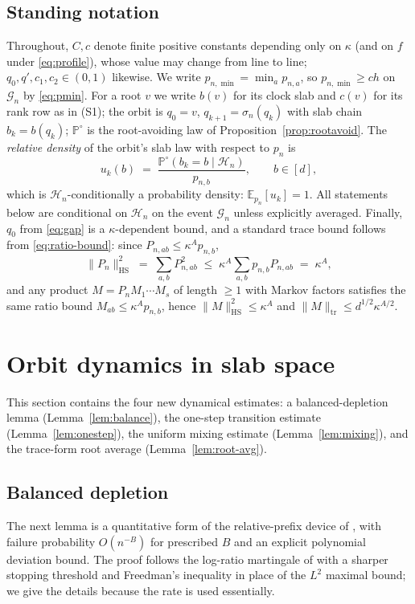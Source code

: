 \documentclass[11pt]{article}
\newcommand{\E}{\mathbb{E}}
\newcommand{\Prob}{\mathbb{P}}
\newcommand{\1}{\mathbf{1}}
\newcommand{\cG}{\mathcal{G}}
\newcommand{\cH}{\mathcal{H}}
\theoremstyle{remark}
\begin{document}
\subsection{Standing notation}
Throughout, $C,c$ denote finite positive constants depending only on $\kappa$
(and on $f$ under \eqref{eq:profile}), whose value may change from line to
line; $q_0,q',c_1,c_2\in(0,1)$ likewise. We write
$p_{n,\min}=\min_a p_{n,a}$, so $p_{n,\min}\ge ch$ on $\cG_n$ by
\eqref{eq:pmin}. For a root $v$ we write $b(v)$ for its clock slab and $c(v)$
for its rank row as in (S1); the orbit is $q_0=v$, $q_{k+1}=\sigma_n(q_k)$
with slab chain $b_k=b(q_k)$; $\Prob^\circ$ is the root-avoiding law of
Proposition~\ref{prop:rootavoid}. The \emph{relative density} of the orbit's
slab law with respect to $p_n$ is
\[
u_k(b)\;=\;\frac{\Prob^\circ(b_k=b\mid\cH_n)}{p_{n,b}},\qquad b\in[d],
\]
which is $\cH_n$-conditionally a probability density: $\E_{p_n}[u_k]=1$.
All statements below are conditional on $\cH_n$ on the event $\cG_n$ unless
explicitly averaged. Finally, $q_0$ from \eqref{eq:gap} is a
$\kappa$-dependent bound, and a standard trace bound follows from
\eqref{eq:ratio-bound}: since $P_{n,ab}\le\kappa^A p_{n,b}$,
\begin{equation}\label{eq:hs}
\|P_n\|_{\mathrm{HS}}^2\;=\;\sum_{a,b}P_{n,ab}^2
\;\le\;\kappa^A\sum_{a,b}p_{n,b}P_{n,ab}\;=\;\kappa^A,
\end{equation}
and any product $M=P_nM_1\cdots M_s$ of length $\ge1$ with Markov factors
satisfies the same ratio bound $M_{ab}\le\kappa^Ap_{n,b}$, hence
$\|M\|_{\mathrm{HS}}^2\le\kappa^A$ and $\|M\|_{\mathrm{tr}}\le
d^{1/2}\kappa^{A/2}$.

\section{Orbit dynamics in slab space}\label{sec:orbit}

This section contains the four new dynamical estimates: a balanced-depletion
lemma (Lemma~\ref{lem:balance}), the one-step transition estimate
(Lemma~\ref{lem:onestep}), the uniform mixing estimate
(Lemma~\ref{lem:mixing}), and the trace-form root average
(Lemma~\ref{lem:root-avg}).

\subsection{Balanced depletion}
The next lemma is a quantitative form of the relative-prefix device of
\cite[Lemma~6.7]{Lon26}, with failure probability $O(n^{-B})$ for prescribed
$B$ and an explicit polynomial deviation bound. The proof follows the
log-ratio martingale of \cite[Lemma~6.7]{Lon26} with a sharper stopping
threshold and Freedman's inequality in place of the $L^2$ maximal bound; we
give the details because the rate is used essentially.
\end{document}
